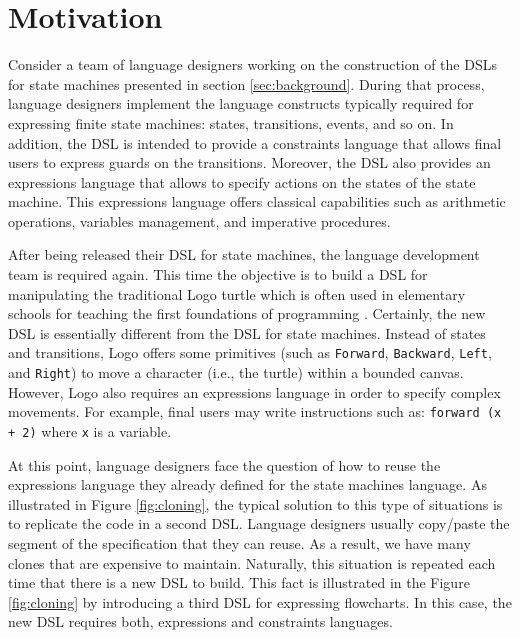\section{Motivation}
\label{sec:motivation}

Consider a team of language designers working on the construction of the DSLs for state machines presented in section \ref{sec:background}. During that process, language designers implement the language constructs typically required for expressing finite state machines: states, transitions, events, and so on. In addition, the DSL is intended to provide a constraints language that allows final users to express guards on the transitions. Moreover, the DSL also provides an expressions language that allows to specify actions on the states of the state machine. This expressions language offers classical capabilities such as arithmetic operations, variables management, and imperative procedures. 

After being released their DSL for state machines, the language development team is required again. This time the objective is to build a DSL for manipulating the traditional Logo turtle which is often used in elementary schools for teaching the first foundations of programming \cite{Olson:1987}. Certainly, the new DSL is essentially different from the DSL for state machines. Instead of states and transitions, Logo offers some primitives (such as \texttt{Forward}, \texttt{Backward}, \texttt{Left}, and \texttt{Right}) to move a character (i.e., the turtle) within a bounded canvas. However, Logo also requires an expressions language in order to specify complex movements. For example, final users may write instructions such as: \texttt{forward (x + 2)} where \texttt{x} is a variable.

At this point, language designers face the question of how to reuse the expressions language they already defined for the state machines language. As illustrated in Figure \ref{fig:cloning}, the typical solution to this type of situations is to replicate the code in a second DSL. Language designers usually copy/paste the segment of the specification that they can reuse. As a result, we have many clones that are expensive to maintain. Naturally, this situation is repeated each time that there is a new DSL to build. This fact is illustrated in the Figure \ref{fig:cloning} by introducing a third DSL for expressing flowcharts. In this case, the new DSL requires both, expressions and constraints languages. 

